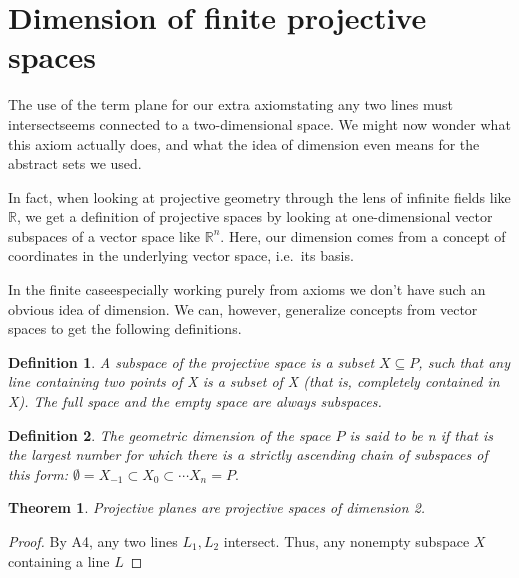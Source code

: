 \documentclass[12pt]{article}
\newtheorem{theorem}{Theorem}
\newtheorem{definition}{Definition}
\begin{document}
    \section{Dimension of finite projective spaces}

    The use of the term plane for our extra axiom\textemdash stating any two lines must intersect\textemdash seems connected to a two-dimensional space.
    We might now wonder what this axiom actually does, and what the idea of dimension even means for the abstract sets we used.

    In fact, when looking at projective geometry through the lens of infinite fields like $\mathbb{R}$,
    we get a definition of projective spaces by looking at one-dimensional vector subspaces of a vector space like $\mathbb{R}^n$.\cite{weisstein_projective_nodate}
    Here, our dimension comes from a concept of coordinates in the underlying vector space, i.e.\ its basis.

    In the finite case\textemdash especially working purely from axioms\textemdash
    we don't have such an obvious idea of dimension.
    We can, however, generalize concepts from vector spaces to get the following definitions.\cite{noauthor_projective_2024,beutelspacher_projective_2000}

    \begin{definition}
        A subspace of the projective space is a subset $X \subseteq P$,
        such that any line containing two points of X is a subset of X (that is, completely contained in X).
        The full space and the empty space are always subspaces.
    \end{definition}

    \begin{definition}
        The geometric dimension of the space $P$ is said to be n if that is the largest number for which there is a strictly ascending chain of subspaces of this form:
        $\emptyset = X_{-1}\subset X_{0}\subset \cdots X_{n}=P.$
    \end{definition}

    \begin{theorem}
        Projective planes are projective spaces of dimension 2.
    \end{theorem}

    \begin{proof}
        By A4, any two lines $L_1, L_2$ intersect.
        Thus, any nonempty subspace $X$ containing a line $L$
    \end{proof}
\end{document}
